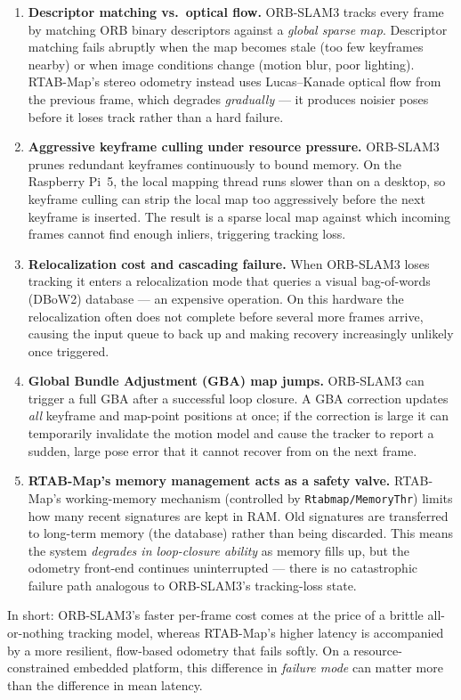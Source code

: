 \documentclass[11pt]{article}
\begin{document}
\begin{enumerate}
  \item \textbf{Descriptor matching vs.\ optical flow.}
        ORB-SLAM3 tracks every frame by matching ORB binary descriptors against a \emph{global sparse map}.
        Descriptor matching fails abruptly when the map becomes stale (too few keyframes nearby) or when image conditions change (motion blur, poor lighting).
        RTAB-Map's stereo odometry instead uses Lucas--Kanade optical flow from the previous frame, which degrades \emph{gradually} — it produces noisier poses before it loses track rather than a hard failure.

  \item \textbf{Aggressive keyframe culling under resource pressure.}
        ORB-SLAM3 prunes redundant keyframes continuously to bound memory.
        On the Raspberry Pi~5, the local mapping thread runs slower than on a desktop, so keyframe culling can strip the local map too aggressively before the next keyframe is inserted.
        The result is a sparse local map against which incoming frames cannot find enough inliers, triggering tracking loss.

  \item \textbf{Relocalization cost and cascading failure.}
        When ORB-SLAM3 loses tracking it enters a relocalization mode that queries a visual bag-of-words (DBoW2) database — an expensive operation.
        On this hardware the relocalization often does not complete before several more frames arrive, causing the input queue to back up and making recovery increasingly unlikely once triggered.

  \item \textbf{Global Bundle Adjustment (GBA) map jumps.}
        ORB-SLAM3 can trigger a full GBA after a successful loop closure.
        A GBA correction updates \emph{all} keyframe and map-point positions at once; if the correction is large it can temporarily invalidate the motion model and cause the tracker to report a sudden, large pose error that it cannot recover from on the next frame.

  \item \textbf{RTAB-Map's memory management acts as a safety valve.}
        RTAB-Map's working-memory mechanism (controlled by \texttt{Rtabmap/MemoryThr}) limits how many recent signatures are kept in RAM.
        Old signatures are transferred to long-term memory (the database) rather than being discarded.
        This means the system \emph{degrades in loop-closure ability} as memory fills up, but the odometry front-end continues uninterrupted — there is no catastrophic failure path analogous to ORB-SLAM3's tracking-loss state.
\end{enumerate}

In short: ORB-SLAM3's faster per-frame cost comes at the price of a brittle all-or-nothing tracking model, whereas RTAB-Map's higher latency is accompanied by a more resilient, flow-based odometry that fails softly.
On a resource-constrained embedded platform, this difference in \emph{failure mode} can matter more than the difference in mean latency.
\end{document}
